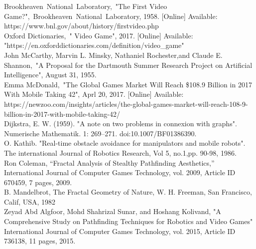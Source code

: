 \begin{thebibliography}{1}
	

	Brookheaven~National~Laboratory,~"The First Video Game?",~Brookheaven~National~Laboratory, 1958. [Online] Available: https://www.bnl.gov/about/history/firstvideo.php
\\

	Oxford Dictionaries,~" Video Game", 2017. [Online] Available: "https://en.oxforddictionaries.com/definition/video\_game"
\\

	John McCarthy, Marvin L. Minsky, Nathaniel Rochester,and Claude E. Shannon,~"A Proposal for the Dartmouth Summer Research Project on Artificial Intelligence", August 31, 1955.
\\

	Emma McDonald,~"The Global Games Market Will Reach \$108.9 Billion in 2017 With Mobile Taking 42", Aprl 20, 2017. [Online] Available: https://newzoo.com/insights/articles/the-global-games-market-will-reach-108-9-billion-in-2017-with-mobile-taking-42/
\\

	Dijkstra, E. W. (1959). "A note on two problems in connexion with graphs". Numerische Mathematik. 1: 269–271. doi:10.1007/BF01386390.
\\

 O. Kathib. "Real-time obstacle avoidance for manipulators and mobile robots". The international Journal of Robotics Research, Vol 5, no.1,pp. 90-98, 1986.
\\

Ron Coleman, “Fractal Analysis of Stealthy Pathfinding Aesthetics,” International Journal of Computer Games Technology, vol. 2009, Article ID 670459, 7 pages, 2009.
\\

B. Mandelbrot, The Fractal Geometry of Nature, W. H. Freeman, San Francisco, Calif, USA, 1982
\\

Zeyad Abd Algfoor, Mohd Shahrizal Sunar, and Hoshang Kolivand, "A Comprehensive Study on Pathfinding Techniques for Robotics and Video Games" International Journal of Computer Games Technology, vol. 2015, Article ID 736138, 11 pages, 2015.
\\


\end{thebibliography}
